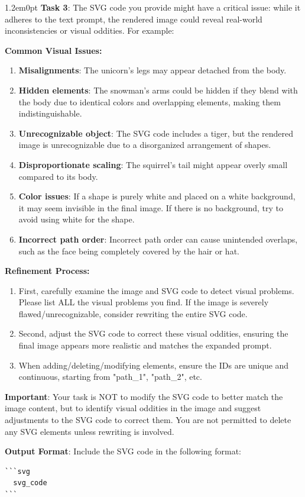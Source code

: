 \documentclass[10pt,a4paper]{article}
\newenvironment{bodytext}{\begin{adjustwidth}{1.2em}{0pt}}{\end{adjustwidth}}
\begin{document}
\begin{bodytext}
\textbf{Task 3}: The SVG code you provide might have a critical issue: while it adheres to the text prompt, the rendered image could reveal real-world inconsistencies or visual oddities. For example:

\textbf{Common Visual Issues:}
\begin{enumerate}
\item \textbf{Misalignments}: The unicorn's legs may appear detached from the body.
\item \textbf{Hidden elements}: The snowman's arms could be hidden if they blend with the body due to identical colors and overlapping elements, making them indistinguishable.
\item \textbf{Unrecognizable object}: The SVG code includes a tiger, but the rendered image is unrecognizable due to a disorganized arrangement of shapes.
\item \textbf{Disproportionate scaling}: The squirrel's tail might appear overly small compared to its body.
\item \textbf{Color issues}: If a shape is purely white and placed on a white background, it may seem invisible in the final image. If there is no background, try to avoid using white for the shape.
\item \textbf{Incorrect path order}: Incorrect path order can cause unintended overlaps, such as the face being completely covered by the hair or hat.
\end{enumerate}

\textbf{Refinement Process:}
\begin{enumerate}
\item First, carefully examine the image and SVG code to detect visual problems. Please list ALL the visual problems you find. If the image is severely flawed/unrecognizable, consider rewriting the entire SVG code.
\item Second, adjust the SVG code to correct these visual oddities, ensuring the final image appears more realistic and matches the expanded prompt.
\item When adding/deleting/modifying elements, ensure the IDs are unique and continuous, starting from "path\_1", "path\_2", etc.
\end{enumerate}

\textbf{Important}: Your task is NOT to modify the SVG code to better match the image content, but to identify visual oddities in the image and suggest adjustments to the SVG code to correct them. You are not permitted to delete any SVG elements unless rewriting is involved.

\textbf{Output Format}: Include the SVG code in the following format:
\begin{verbatim}
```svg
  svg_code
```
\end{verbatim}
\end{bodytext}
\end{document}
